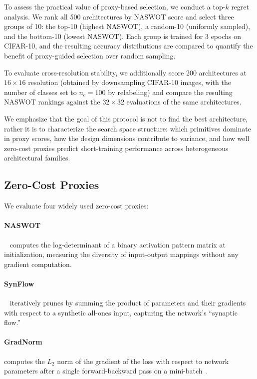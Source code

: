 \documentclass[10pt,twocolumn,letterpaper]{article}
\newcommand{\naswot}{NASWOT\xspace}
\begin{document}
To assess the practical value of proxy-based selection, we conduct a top-$k$ regret analysis. We rank all 500 architectures by \naswot score and select three groups of 10: the top-10 (highest \naswot), a random-10 (uniformly sampled), and the bottom-10 (lowest \naswot). Each group is trained for 3 epochs on CIFAR-10, and the resulting accuracy distributions are compared to quantify the benefit of proxy-guided selection over random sampling.

To evaluate cross-resolution stability, we additionally score 200 architectures at $16 \times 16$ resolution (obtained by downsampling CIFAR-10 images, with the number of classes set to $n_c = 100$ by relabeling) and compare the resulting \naswot rankings against the $32 \times 32$ evaluations of the same architectures.

We emphasize that the goal of this protocol is not to find the best architecture, rather it is to characterize the search space structure: which primitives dominate in proxy scores, how the design dimensions contribute to variance, and how well zero-cost proxies predict short-training performance across heterogeneous architectural families.

\subsection{Zero-Cost Proxies}
\label{sec:proxies}

We evaluate four widely used zero-cost proxies:

\paragraph{NASWOT}~\cite{mellor2021naswot} computes the log-determinant of a binary activation pattern matrix at initialization, measuring the diversity of input-output mappings without any gradient computation.

\paragraph{SynFlow}~\cite{tanaka2020synflow} iteratively prunes by summing the product of parameters and their gradients with respect to a synthetic all-ones input, capturing the network's ``synaptic flow.''

\paragraph{GradNorm} computes the $L_2$ norm of the gradient of the loss with respect to network parameters after a single forward-backward pass on a mini-batch~\cite{abdelfattah2021zerocost}.
\end{document}
